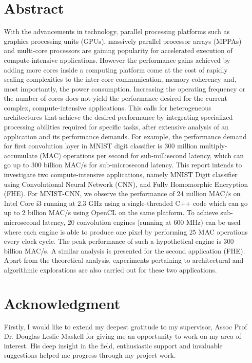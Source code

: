 \chapter*{Abstract} 
\label{ch0i_Abstract}
\quad With the advancements in technology, parallel processing platforms such as graphics processing units (GPUs), massively parallel processor arrays (MPPAs) and multi-core processors are gaining popularity for accelerated execution of compute-intensive applications. However the performance gains achieved by adding more cores inside a computing platform come at the cost of rapidly scaling complexities to the inter-core communication, memory coherency and, most importantly, the power consumption. Increasing the operating frequency or the number of cores does not yield the performance desired for the current complex, compute-intensive applications. This calls for heterogeneous architectures that achieve the desired performance by integrating specialized processing abilities required for specific tasks, after extensive analysis of an application and its performance demands. For example, the performance demand for first convolution layer in MNIST digit classifier is 300 million multiply-accumulate (MAC) operations per second for sub-millisecond latency, which can go up to 300 billion MAC/s for sub-microsecond latency. 
\newline This report intends to investigate two compute-intensive applications, namely MNIST Digit classifier using Convolutional Neural Network (CNN), and Fully Homomorphic Encryption (FHE). For MNIST-CNN, we observe the performance of 24 million MAC/s on Intel Core i3 running at 2.3 GHz using a single-threaded C++ code which can go up to 2 billion MAC/s using OpenCL on the same platform. To achieve sub-microsecond latency, 20 convolution engines (running at 600 MHz) can be used where each engine is able to produce one pixel by performing 25 MAC operations every clock cycle. The peak performance of such a hypothetical engine is 300 billion MAC/s. A similar analysis is presented for the second application (FHE). Apart from the theoretical analysis, experiments pertaining to architectural and algorithmic explorations are also carried out for these two applications. 
\chapter*{Acknowledgment} 
\label{ch0ii_Acknowledgement}

\quad Firstly, I would like to extend my deepest gratitude to my supervisor, Assoc Prof Dr. Douglas Leslie Maskell for giving me an opportunity to work on my area of interest. His deep insight in the field, enthusiastic support and invaluable suggestions helped me progress through my project work. \newline

